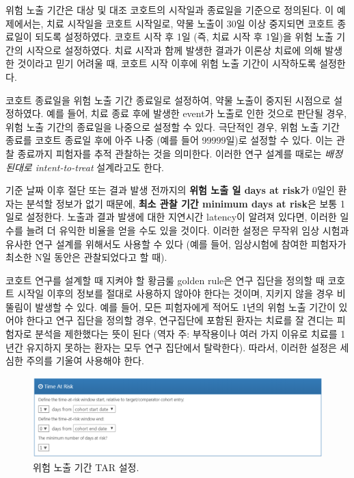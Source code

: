 \documentclass[10.5pt]{book}
\theoremstyle{definition}
\theoremstyle{definition}
\theoremstyle{definition}
\theoremstyle{remark}
\let\BeginKnitrBlock\begin \let\EndKnitrBlock\end
\begin{document}
위험 노출 기간은 대상 및 대조 코호트의 시작일과 종료일을 기준으로
정의된다. 이 예제에서는, 치료 시작일을 코호트 시작일로, 약물 노출이 30일
이상 중지되면 코호트 종료일이 되도록 설정하였다. 코호트 시작 후 1일 (즉,
치료 시작 후 1일)을 위험 노출 기간의 시작으로 설정하였다. 치료 시작과
함께 발생한 결과가 이론상 치료에 의해 발생한 것이라고 믿기 어려울 때,
코호트 시작 이후에 위험 노출 기간이 시작하도록 설정한다.

코호트 종료일을 위험 노출 기간 종료일로 설정하여, 약물 노출이 중지된
시점으로 설정하였다. 예를 들어, 치료 종료 후에 발생한 event가 노출로
인한 것으로 판단될 경우, 위험 노출 기간의 종료일을 나중으로 설정할 수
있다. 극단적인 경우, 위험 노출 기간 종료를 코호트 종료일 후에 아주 나중
(예를 들어 99999일)로 설정할 수 있다. 이는 관찰 종료까지 피험자를 추적
관찰하는 것을 의미한다. 이러한 연구 설계를 때로는 \emph{배정된대로
intent-to-treat} 설계라고도 한다.

기준 날짜 이후 절단 또는 결과 발생 전까지의 \textbf{위험 노출 일 days at
risk}가 0일인 환자는 분석할 정보가 없기 때문에, \textbf{최소 관찰 기간
minimum days at risk}은 보통 1일로 설정한다. 노출과 결과 발생에 대한
지연시간 latency이 알려져 있다면, 이러한 일수를 늘려 더 유익한 비율을
얻을 수도 있을 것이다. 이러한 설정은 무작위 임상 시험과 유사한 연구
설계를 위해서도 사용할 수 있다 (예를 들어, 임상시험에 참여한 피험자가
최소한 N일 동안은 관찰되었다고 할 때).

\BeginKnitrBlock{rmdimportant}
코호트 연구를 설계할 때 지켜야 할 황금룰 golden rule은 연구 집단을
정의할 때 코호트 시작일 이후의 정보를 절대로 사용하지 않아야 한다는
것이며, 지키지 않을 경우 비뚤림이 발생할 수 있다. 예를 들어, 모든
피험자에게 적어도 1년의 위험 노출 기간이 있어야 한다고 연구 집단을
정의할 경우, 연구집단에 포함된 환자는 치료를 잘 견디는 피험자로 분석을
제한했다는 뜻이 된다 (역자 주: 부작용이나 여러 가지 이유로 치료를 1년간
유지하지 못하는 환자는 모두 연구 집단에서 탈락한다). 따라서, 이러한
설정은 세심한 주의를 기울여 사용해야 한다.
\EndKnitrBlock{rmdimportant}

\begin{figure}

{\centering \includegraphics[width=1\linewidth]{images/PopulationLevelEstimation/timeAtRisk} 

}

\caption{위험 노출 기간 TAR 설정.}\label{fig:timeAtRisk}
\end{figure}
\end{document}
